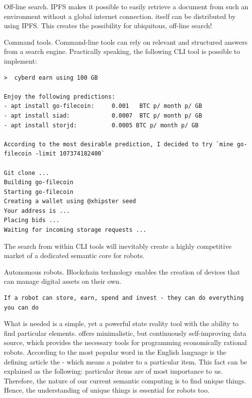 \documentclass[8pt,oneside]{amsart}
\newcommand{\linkred}[2]{\href{#1}{\color{red}{#2}}}
\newcommand{\linkgreen}[2]{\href{#1}{\color{green}{#2}}}
\newcommand{\code}[1]{{\PlayBold #1}}
\begin{document}
Off-line search. IPFS makes it possible to easily retrieve a document from such an environment without a global internet connection. \linkred{https://github.com/cybercongress/cyberd}{cyberd} itself can be distributed by using IPFS. This creates the possibility for ubiquitous, off-line search!

Command tools. Command-line tools can rely on relevant and structured answers from a search engine. Practically speaking, the following CLI tool is possible to implement:

\begin{lstlisting}
>  cyberd earn using 100 GB

Enjoy the following predictions:
- apt install go-filecoin:     0.001   BTC p/ month p/ GB
- apt install siad:            0.0007  BTC p/ month p/ GB
- apt install storjd:          0.0005 BTC p/ month p/ GB

According to the most desirable prediction, I decided to try `mine go-filecoin -limit 107374182400`

Git clone ...
Building go-filecoin
Starting go-filecoin
Creating a wallet using @xhipster seed
Your address is ...
Placing bids ...
Waiting for incoming storage requests ...
\end{lstlisting}

The search from within CLI tools will inevitably create a highly competitive market of a dedicated semantic core for robots.

Autonomous robots. Blockchain technology enables the creation of devices that can manage digital assets on their own.

\begin{lstlisting}
If a robot can store, earn, spend and invest - they can do everything you can do
\end{lstlisting}

What is needed is a simple, yet a powerful state reality tool with the ability to find particular elements. \linkred{https://github.com/cybercongress/cyberd}{cyberd} offers minimalistic, but continuously self-improving data source, which provides the necessary tools for programming economically rational robots. According to \linkgreen{https://github.com/first20hours/google-10000-english}{top-10,000 English words} the most popular word in the English language is the defining article \code{the} - which means a pointer to a particular item. This fact can be explained as the following: particular items are of most importance to us. Therefore, the nature of our current semantic computing is to find unique things. Hence, the understanding of unique things is essential for robots too.
\end{document}
